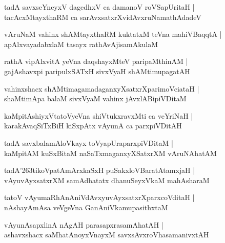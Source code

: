 \documentclass[twoside,12pt,openright]{book}
\def\S{\char'263}
\newcounter{shloka}[chapter]
\begin{document}
\begin{shloka}%
tadA savxseYneyxV dagedhxV ca damanoV roVSapUritaH |\\
tacAcxMtayxthaRM ca sarAvxsatxrXvidAvxruNamathAdadeV
\end{shloka}

\begin{shloka}%
vAruNaM vahinx shAMtayxthaRM kuktatxM teVna mahiVBaqqtA |\\
apAlxvayadabxlaM tasayx rathAvAjisamAkulaM 
\end{shloka}

\begin{shloka}%
rathA vipAlxvitA yeVna daqshayxMteV paripaMthinAM |\\
gajAshavxpi paripulxSATxH sivxVyaH shAMtimupagatAH 
\end{shloka}

\begin{shloka}%
vahinxshacx shAMtimagamadaganxyXsatxrXparimoVciataH |\\
shaMtimApa balaM sivxVyaM vahinx jAvxlABipiVDitaM 
\end{shloka}

\begin{shloka}%
kaMpitAshiyxVtatoVyeVna shiVtukxravxMti ca veYriNaH |\\
karakAvaqSiTxBiH kiSxpAtx vAyunA ca parxpiVDitAH 
\end{shloka}

\begin{shloka}%
tadA savxbalamAloVkayx toVyapUraparxpiVDitaM |\\
kaMpitAM kuSxBitaM naSaTxmaganxyXSatxrXM vAruNAhatAM 
\end{shloka}

\begin{shloka}%
tadA\S tikoVpatAmArxkaSxH puSakxloVBaratAtamxjaH |\\
vAyuvAyxsatxrXM samAdhatatx dhanuSeyxVkaM mahAsharaM 
\end{shloka}

\begin{shloka}%
tatoV vAyumaRhAnAniVdAvxyuvAyxsatxrXparxcoVditaH |\\
nAshayAmAsa veVgeVna GanAniVkamupasithxtaM
\end{shloka}

\begin{shloka}%
vAyunAsapxlinA nAgAH parasapxrasamAhatAH |\\
ashavxshacx saMhatAnoyxVnayxM savxsAvxroVhasamanivxtAH 
\end{shloka}
\end{document}
